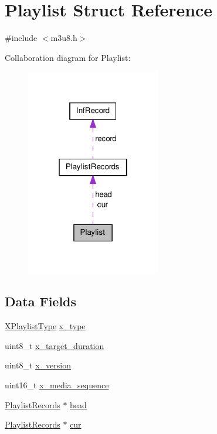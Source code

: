 \hypertarget{struct_playlist}{\section{\-Playlist \-Struct \-Reference}
\label{struct_playlist}
}


{\ttfamily \#include $<$m3u8.\-h$>$}



\-Collaboration diagram for \-Playlist\-:\nopagebreak
\begin{figure}[H]
\begin{center}
\leavevmode
\includegraphics[width=166pt]{struct_playlist__coll__graph}
\end{center}
\end{figure}
\subsection*{\-Data \-Fields}
\begin{DoxyCompactItemize}
\item 
\hyperlink{m3u8_8h_a10b575ed914a0da1857ff058a326b7d2}{\-X\-Playlist\-Type} \hyperlink{struct_playlist_a37c60895b60bcb1cc626eae5885e0540}{x\-\_\-type}
\item 
uint8\-\_\-t \hyperlink{struct_playlist_a6362cba4f7d923dd7687284f0a890017}{x\-\_\-target\-\_\-duration}
\item 
uint8\-\_\-t \hyperlink{struct_playlist_adbfa9836e57d677968274360b90147ce}{x\-\_\-version}
\item 
uint16\-\_\-t \hyperlink{struct_playlist_a5777a3f8846ff7f63461d4a0bad7ad09}{x\-\_\-media\-\_\-sequence}
\item 
\hyperlink{struct_playlist_records}{\-Playlist\-Records} $\ast$ \hyperlink{struct_playlist_adbbc6e0a2881880caf79e9b2d0ee9d09}{head}
\item 
\hyperlink{struct_playlist_records}{\-Playlist\-Records} $\ast$ \hyperlink{struct_playlist_a0d3665b271a9105ad516c49c5572c77b}{cur}
\end{DoxyCompactItemize}


